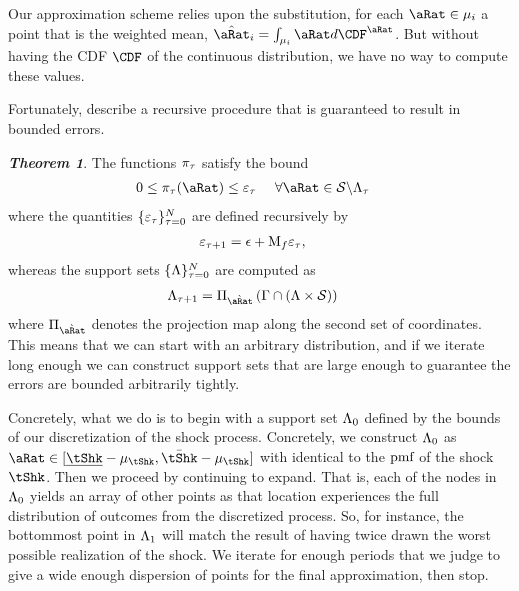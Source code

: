 \documentclass[../BufferStockTheory.tex]{subfiles}\usepackage{ApndxSteadyState}
\begin{document}
  Our approximation scheme relies upon the substitution, for each $\point \in \SetSub_{i}$ a point that is the weighted mean, $\hat{\point}_{\this} = \int_{\SetSub_{i}}\point d\CDF^{\point}$.  But without having the CDF $\CDF$ of the continuous distribution, we have no way to compute these values.

  Fortunately, \cite{eaDiscretize} describe a recursive procedure that is guaranteed to result in bounded errors.

  \textit{\textbf{Theorem 1}}. The functions $\pi_{\tau}$ satisfy the bound
  \begin{align}
    0 & \leq \pDens_{\tAbs}(\point) \leq \varepsilon_{\tAbs}~~~~\forall \point \in \DistSetSprtFull \backslash \DistSetSprtTrnc_{\tAbs}
  \end{align}
\noindent where the quantities $\{\varepsilon_{\tau}\}_{\tau=0}^{N}$ are defined recursively by
  \begin{align}
    \varepsilon_{\tau+1} &= \epsilon + \mathrm{M}_{f}\varepsilon_{\tau},
  \end{align}
  whereas the support sets $\{\Lambda\}_{\tau=0}^{N}$ are computed as
  \begin{align}
    \DistSetSprtTrnc_{\tAbs+1} &= \Pi_{\Nxt{\point}}\left(\TrnsSetSprtTrnc \cap (\DistSetSprtTrnc \times \DistSetSprtFull)\right)
  \end{align}
  where $\Pi_{\Nxt{\point}}$ denotes the projection map along the second set of coordinates.
  This means that we can start with an arbitrary distribution, and if we iterate long enough we can construct support sets that are large enough to guarantee the errors are bounded arbitrarily tightly.

  Concretely, what we do is to begin with a support set $\Lambda_{0}$ defined by the bounds of our discretization of the shock process. Concretely, we construct $\Lambda_{0}$ as $\point \in [\Bot{\tShk}-\tShkMean,\Top{\tShk}-\tShkMean]$ with {\pmf} identical to the ${\textrm{pmf}}$ of the shock $\tShk$.  Then we proceed by continuing to expand.  That is, each of the nodes in $\Lambda_{0}$ yields an array of other points as that location experiences the full distribution of outcomes from the discretized process.  So, for instance, the bottommost point in $\Lambda_{1}$ will match the result of having twice drawn the worst possible realization of the shock.  We iterate for enough periods that we judge to give a wide enough dispersion of points for the final approximation, then stop.
\end{document}
